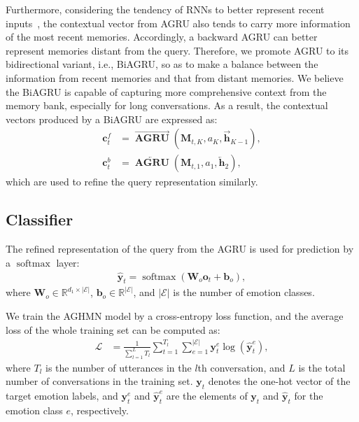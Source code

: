 \documentclass[letterpaper]{article} %
\DeclareMathOperator{\AGRU}{\mathbf{AGRU}}
\DeclareMathOperator{\softmax}{softmax}
\begin{document}
Furthermore, considering the tendency of RNNs to better represent recent inputs~\cite{DBLP:journals/corr/BahdanauCB14}, the contextual vector from AGRU also tends to carry more information of the most recent memories. Accordingly, a backward AGRU can better represent memories distant from the query. Therefore, we promote AGRU to its bidirectional variant, i.e., BiAGRU, so as to make a balance between the information from recent memories and that from distant memories. We believe the BiAGRU is capable of capturing more comprehensive context from the memory bank, especially for long conversations. As a result, the contextual vectors produced by a BiAGRU are expressed as:
\begin{align}
    \mathbf{c}_t^f &= \overrightarrow{\AGRU}(\mathbf{M}_{t,K}, a_{K}, \overrightarrow{\mathbf{h}}_{K-1}), \\
    \mathbf{c}_t^b &= \overleftarrow{\AGRU}(\mathbf{M}_{t,1}, a_{1}, \overleftarrow{\mathbf{h}}_{2}),
\end{align}
which are used to refine the query representation similarly.


\subsection{Classifier}

The refined representation of the query from the AGRU is used for prediction by a $\softmax$ layer:
\begin{align}
    \hat{\mathbf{y}}_t = \softmax(\mathbf{W}_o\mathbf{o}_t + \mathbf{b}_o),
\end{align}
where $\mathbf{W}_o\in \mathbb{R}^{d_1\times|\mathcal{E}|}$, $\mathbf{b}_o\in \mathbb{R}^{|\mathcal{E}|}$, and $|\mathcal{E}|$ is the number of emotion classes.

We train the AGHMN model by a cross-entropy loss function, and the average loss of the whole training set can be computed as:
\begin{align}
\mathcal{L} &= \frac{1}{\sum_{l=1}^{L}T_l}\sum_{t=1}^{T_l}
\sum_{e=1}^{|\mathcal{E}|}\mathbf{y}_t^e\log(\hat{\mathbf{y}}_t^e),
\end{align}
where $T_l$ is the number of utterances in the $l$th conversation, and $L$ is the total number of conversations in the training set. $\mathbf{y}_t$ denotes the one-hot vector of the target emotion labels, and $\mathbf{y}_t^e$ and $\hat{\mathbf{y}}_t^e$ are the elements of $\mathbf{y}_t$ and $\hat{\mathbf{y}}_t$ for the emotion class $e$, respectively.
\end{document}
